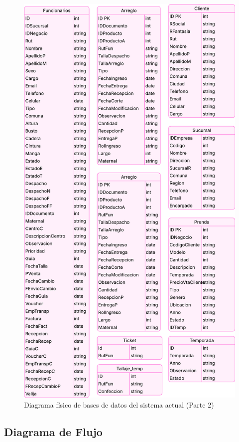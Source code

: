 \begin{figure}[htbp]
    \centering
    \includegraphics[height=0.9\textheight]{figuras/diagramas-actuales/diagrama-bdd-2}
    \caption{Diagrama físico de bases de datos del sistema actual (Parte 2)}
    \label{fig:diagrama-bdd-2-actual}
\end{figure}


\subsection{Diagrama de Flujo}


